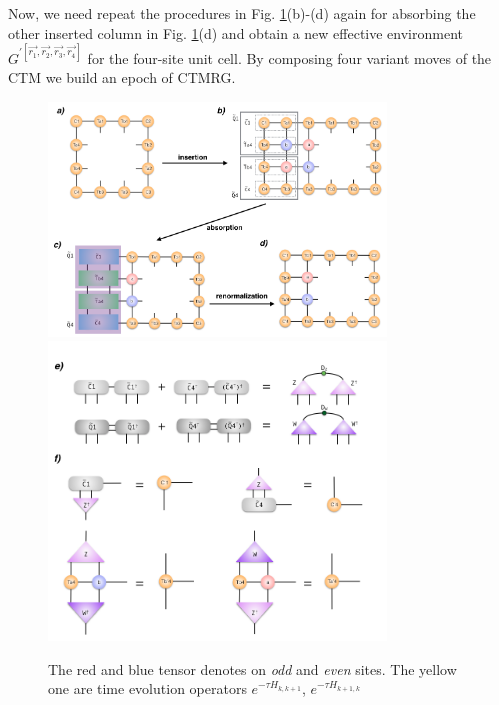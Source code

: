 Now, we need repeat the procedures in Fig. \ref{fig512}(b)-(d) again for absorbing the other inserted column in Fig. \ref{fig512}(d) and obtain a new effective environment $G^{\prime \left[\vec{r_1},\vec{r_2},\vec{r_3},\vec{r_4}\right]}$ for the four-site unit cell. By composing four variant moves of the CTM we build an epoch of CTMRG. 

\begin{figure}[ht]
	\centering
	\includegraphics[width=0.80\textwidth]{figures/fig512.png}
	\includegraphics[width=0.80\textwidth]{figures/fig513.png}
	\caption[The picture of the main idea of itebd.]{The red and blue tensor denotes on \textit{odd} and \textit{even} sites. The yellow one are time evolution operators $e^{-\tau H_{k,k+1}}$, $e^{-\tau H_{k+1,k}}$}
	\label{fig512}
\end{figure}

